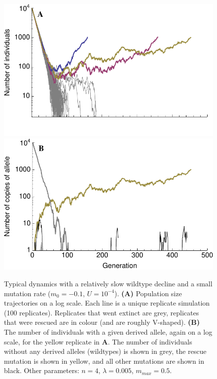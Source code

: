 \documentclass[9pt,twocolumn,twoside,lineno]{gsajnl}
\begin{document}
\begin{figure}[!h]
\centering
\includegraphics[width=\linewidth]{../IMAGES/Vshape.pdf}\\
\includegraphics[width=\linewidth]{../IMAGES/VshapeMutations.pdf}
\caption{
Typical dynamics with a relatively slow wildtype decline and a small mutation rate ($m_0 = -0.1$, $U=10^{-4}$).
\textbf{(A)} Population size trajectories on a log scale.
Each line is a unique replicate simulation (100 replicates).
Replicates that went extinct are grey, replicates that were rescued are in colour (and are roughly V-shaped).
\textbf{(B)} The number of individuals with a given derived allele, again on a log scale, for the yellow replicate in \textbf{A}.
The number of individuals without any derived alleles (wildtypes) is shown in grey, the rescue mutation is shown in yellow, and all other mutations are shown in black.
Other parameters: $n=4$, $\lambda=0.005$, $m_{max}=0.5$.
}%
\label{fig:Vshape}
\end{figure}
\end{document}
